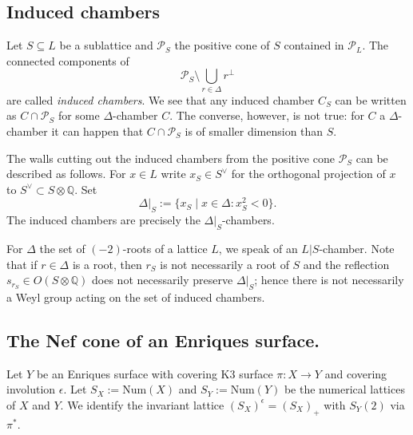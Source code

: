 \documentclass[a4paper]{amsart}
\theoremstyle{definition}
\theoremstyle{plain}
\newcommand{\QQ}{\mathbb{Q}}
\renewcommand{\P}{\mathcal{P}}
\begin{document}
\subsection*{Induced chambers} 
Let $S \subseteq L$ be a sublattice and $\P_S$ the positive cone of $S$ contained in $\P_L$. 
The connected components of 
\[\P_S \setminus \bigcup_{r \in \Delta} r^\perp\] 
are called \emph{induced chambers}. 
We see that any induced chamber $C_S$ can be written as $C \cap \P_S$ for some $\Delta$-chamber $C$. The converse, however, is not true:
for $C$ a $\Delta$-chamber it can happen that $C \cap \P_S$ is of smaller dimension than $S$. 

The walls cutting out the induced chambers from the positive cone $\P_S$ can be described as follows.
For $x \in L$ write $x_S \in S^{\vee}$ for the orthogonal projection of $x$ to $S^\vee\subset S\otimes\QQ$.
Set
\[\Delta|_S :=\{ x_S \mid x \in \Delta: x_S^2<0\}.\]
The induced chambers are precisely the $\Delta|_S$-chambers. 

For $\Delta$ the set of $(-2)$-roots of a lattice $L$, we speak of an $L|S$-chamber.
Note that if $r \in \Delta$ is a root, then $r_S$ is not necessarily a root of $S$ and the reflection $s_{r_S} \in O(S \otimes \QQ)$ does not necessarily preserve $\Delta|_S$; hence there is not necessarily a Weyl group acting on the set of induced chambers. 

\subsection{The Nef cone of an Enriques surface.}
Let $Y$ be an Enriques surface with covering K3 surface $\pi \colon X \to Y$ and covering involution $\epsilon$. Let $S_X:=\mathrm{Num}(X)$ and $S_Y:=\mathrm{Num}(Y)$ be the numerical lattices of $X$ and $Y$.
We identify the invariant lattice $(S_X)^\epsilon = (S_X)_+$ with $S_Y(2)$ via $\pi^*$.
\end{document}
